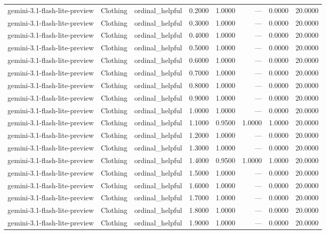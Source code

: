 \begin{table}
\begin{tabular}{llllrrrr}
gemini-3.1-flash-lite-preview & Clothing & ordinal_helpful & 0.2000 & 1.0000 & --- & 0.0000 & 20.0000 \\
gemini-3.1-flash-lite-preview & Clothing & ordinal_helpful & 0.3000 & 1.0000 & --- & 0.0000 & 20.0000 \\
gemini-3.1-flash-lite-preview & Clothing & ordinal_helpful & 0.4000 & 1.0000 & --- & 0.0000 & 20.0000 \\
gemini-3.1-flash-lite-preview & Clothing & ordinal_helpful & 0.5000 & 1.0000 & --- & 0.0000 & 20.0000 \\
gemini-3.1-flash-lite-preview & Clothing & ordinal_helpful & 0.6000 & 1.0000 & --- & 0.0000 & 20.0000 \\
gemini-3.1-flash-lite-preview & Clothing & ordinal_helpful & 0.7000 & 1.0000 & --- & 0.0000 & 20.0000 \\
gemini-3.1-flash-lite-preview & Clothing & ordinal_helpful & 0.8000 & 1.0000 & --- & 0.0000 & 20.0000 \\
gemini-3.1-flash-lite-preview & Clothing & ordinal_helpful & 0.9000 & 1.0000 & --- & 0.0000 & 20.0000 \\
gemini-3.1-flash-lite-preview & Clothing & ordinal_helpful & 1.0000 & 1.0000 & --- & 0.0000 & 20.0000 \\
gemini-3.1-flash-lite-preview & Clothing & ordinal_helpful & 1.1000 & 0.9500 & 1.0000 & 1.0000 & 20.0000 \\
gemini-3.1-flash-lite-preview & Clothing & ordinal_helpful & 1.2000 & 1.0000 & --- & 0.0000 & 20.0000 \\
gemini-3.1-flash-lite-preview & Clothing & ordinal_helpful & 1.3000 & 1.0000 & --- & 0.0000 & 20.0000 \\
gemini-3.1-flash-lite-preview & Clothing & ordinal_helpful & 1.4000 & 0.9500 & 1.0000 & 1.0000 & 20.0000 \\
gemini-3.1-flash-lite-preview & Clothing & ordinal_helpful & 1.5000 & 1.0000 & --- & 0.0000 & 20.0000 \\
gemini-3.1-flash-lite-preview & Clothing & ordinal_helpful & 1.6000 & 1.0000 & --- & 0.0000 & 20.0000 \\
gemini-3.1-flash-lite-preview & Clothing & ordinal_helpful & 1.7000 & 1.0000 & --- & 0.0000 & 20.0000 \\
gemini-3.1-flash-lite-preview & Clothing & ordinal_helpful & 1.8000 & 1.0000 & --- & 0.0000 & 20.0000 \\
gemini-3.1-flash-lite-preview & Clothing & ordinal_helpful & 1.9000 & 1.0000 & --- & 0.0000 & 20.0000 \\

\end{tabular}
\end{table}
